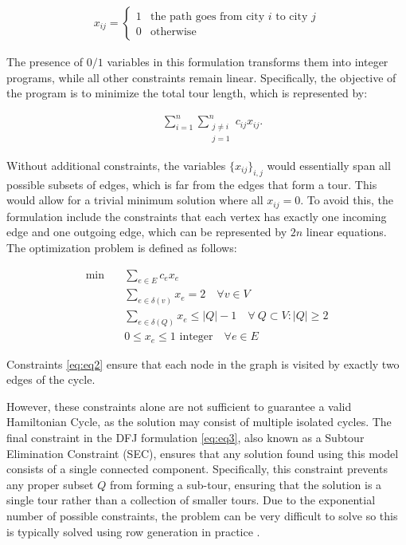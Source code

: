 \begin{align}
    x_{ij} = 
    \begin{cases}
        1 & \text{the path goes from city $i$ to city $j$} \\
        0 & \text{otherwise}
    \end{cases}
\end{align}

The presence of $0/1$ variables in this formulation transforms them into integer programs, while all other constraints remain linear. Specifically, the objective of the program is to minimize the total tour length, which is represented by:

\begin{align}
    \quad \sum_{i=1}^{n} \sum_{\substack{j \neq i \\ j=1}}^{n} c_{ij} x_{ij}.
\end{align}

Without additional constraints, the variables $\{x_{ij}\}_{i,j}$ would essentially span all possible subsets of edges, which is far from the edges that form a tour. This would allow for a trivial minimum solution where all $x_{ij} = 0$. To avoid this, the formulation include the constraints that each vertex has exactly one incoming edge and one outgoing edge, which can be represented by $2n$ linear equations.
The optimization problem is defined as follows:

\begin{align}
    \text{min} \quad & \sum_{e \in E} c_e x_e \label{eq:eq1}\\ 
    \quad & \sum_{e \in \delta(v)} x_{e} = 2 \quad \forall v \in V \label{eq:eq2}\\
    & \sum_{e \in \delta(Q)} x_{e} \leq |Q| - 1 \quad \forall \ Q \subset V:|Q| \geq 2 \label{eq:eq3}\\
    & 0 \leq x_e \leq 1 \text{ integer} \quad \forall e \in E \label{eq:eq4}
\end{align}

\noindent Constraints \ref{eq:eq2} ensure that each node in the graph is visited by exactly two edges of the cycle. 

\newpage

\noindent However, these constraints alone are not sufficient to guarantee a valid Hamiltonian Cycle, as the solution may consist of multiple isolated cycles. The final constraint in the DFJ formulation \ref{eq:eq3}, also known as a Subtour Elimination Constraint (SEC), ensures that any solution found using this model consists of a single connected component. Specifically, this constraint prevents any proper subset \( Q \) from forming a sub-tour, ensuring that the solution is a single tour rather than a collection of smaller tours. Due to the exponential number of possible constraints, the problem can be very difficult to solve so this is typically solved using row generation in practice \cite{wiki:TSP}.